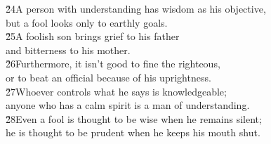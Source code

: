 \begin{poetry}
\poeml \v{24}A person with understanding has wisdom as his objective, \\
\poemll    but a fool looks only to earthly goals. \\
\poeml \v{25}A foolish son brings grief to his father \\
\poemll    and bitterness to his mother. \\
\poeml \v{26}Furthermore, it isn't good to fine the righteous, \\
\poemll    or to beat an official because of his uprightness. \\
\poeml \v{27}Whoever controls what he says is knowledgeable; \\
\poemll    anyone who has a calm spirit is a man of understanding. \\
\poeml \v{28}Even a fool is thought to be wise when he remains silent; \\
\poemll    he is thought to be prudent when he keeps his mouth shut.
\end{poetry}

